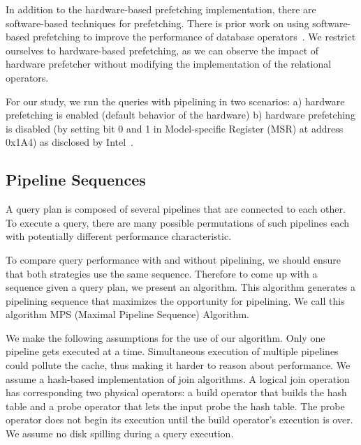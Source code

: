 In addition to the hardware-based prefetching implementation, there are software-based techniques for prefetching.
There is prior work on using software-based prefetching to improve the performance of database operators~\cite{DBLP:conf/icde/ChenAGM04, rof}.
We restrict ourselves to hardware-based prefetching, as we can observe the impact of hardware prefetcher without modifying the implementation of the relational operators.

For our study, we run the queries with pipelining in two scenarios: a) hardware prefetching is enabled (default behavior of the hardware) b) hardware prefetching is disabled (by setting bit 0 and 1 in Model-specific Register (MSR) at address 0x1A4) as disclosed by Intel~\cite{intel-prefetching}.

\subsection{Pipeline Sequences}\label{ssec:pipeline-sequencing-algo}
A query plan is composed of several pipelines that are connected to each other. 
To execute a query, there are many possible permutations of such pipelines each with potentially different performance characteristic. 

To compare query performance with and without pipelining, we should ensure that both strategies use the same sequence.
Therefore to come up with a sequence given a query plan, we present an algorithm.
This algorithm generates a pipelining sequence that maximizes the opportunity for pipelining. 
We call this algorithm MPS (Maximal Pipeline Sequence) Algorithm.

We make the following assumptions for the use of our algorithm. 
Only one pipeline gets executed at a time.
Simultaneous execution of multiple pipelines could pollute the cache, thus making it harder to reason about performance.
We assume a hash-based implementation of join algorithms.
A logical join operation has corresponding two physical operators: a build operator that builds the hash table and a probe operator that lets the input probe the hash table.
The probe operator does not begin its execution until the build operator's execution is over.
We assume no disk spilling during a query execution. 



